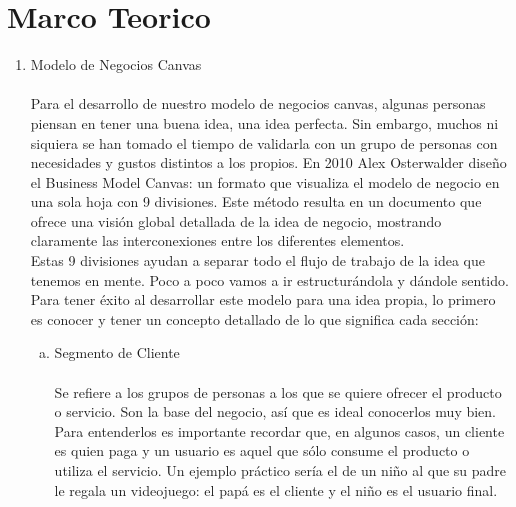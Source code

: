  \section{Marco Teorico} 

\begin{enumerate}[1.]

	\item Modelo de Negocios Canvas
	\\
	\\
	 Para el desarrollo de nuestro modelo de negocios canvas, algunas personas piensan en tener una buena idea, una idea perfecta. Sin embargo, muchos ni siquiera se han tomado el tiempo de validarla con un grupo de personas con necesidades y gustos distintos a los propios. En 2010 Alex Osterwalder diseño el Business Model Canvas: un formato que visualiza el modelo de negocio en una sola hoja con 9 divisiones. Este método resulta en un documento que ofrece una visión global detallada de la idea de negocio, mostrando claramente las interconexiones entre los diferentes elementos.\\
Estas 9 divisiones ayudan a separar todo el flujo de trabajo de la idea que tenemos en mente. Poco a poco vamos a ir estructurándola y dándole sentido. Para tener éxito al desarrollar este modelo para una idea propia, lo primero es conocer y tener un concepto detallado de lo que significa cada sección:\\
		\begin{enumerate}[a)]
			\item Segmento de Cliente \\
			\\
			Se refiere a los grupos de personas a los que se quiere ofrecer el producto o servicio. Son la base del negocio, así que es ideal conocerlos muy bien. Para entenderlos es importante recordar que, en algunos casos, un cliente es quien paga y un usuario es aquel que sólo consume el producto o utiliza el servicio. Un ejemplo práctico sería el de un niño al que su padre le regala un videojuego: el papá es el cliente y el niño es el usuario final.\\


\end{enumerate}
\end{enumerate}
